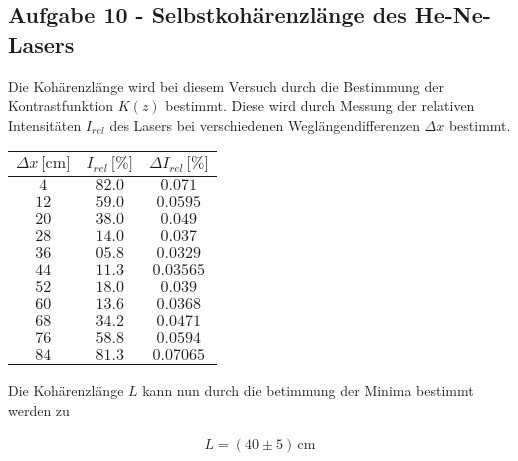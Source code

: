 \subsection*{Aufgabe 10 - Selbstkohärenzlänge des He-Ne-Lasers}
Die Kohärenzlänge wird bei diesem Versuch durch die Bestimmung der Kontrastfunktion $K(z)$ bestimmt. Diese wird durch Messung der relativen Intensitäten $I_{rel}$ des Lasers bei verschiedenen Weglängendifferenzen $\Delta x$ bestimmt.

\begin{center}
\begin{tabular}{c|c|c}
$\Delta x\, \text{[cm]}$ & $I_{rel}\,\text{[\%]}$ & $\Delta I_{rel}\, \text{[\%]}$ \\\hline
\(4\) & \(82.0\) & \(0.071\) \\ 
\(12\) & \(59.0\) & \(0.0595\) \\ 
\(20\) & \(38.0\) & \(0.049\) \\ 
\(28\) & \(14.0\) & \(0.037\) \\ 
\(36\) & \(05.8\) & \(0.0329\) \\ 
\(44\) & \(11.3\) & \(0.03565\) \\ 
\(52\) & \(18.0\) & \(0.039\) \\ 
\(60\) & \(13.6\) & \(0.0368\) \\ 
\(68\) & \(34.2\) & \(0.0471\) \\ 
\(76\) & \(58.8\) & \(0.0594\) \\ 
\(84\) & \(81.3\) & \(0.07065\)
\end{tabular}
\end{center}

Die Kohärenzlänge $L$ kann nun durch die betimmung der Minima bestimmt werden zu

\begin{align}
L = (40 \pm 5)\, \text{cm}
\end{align}
